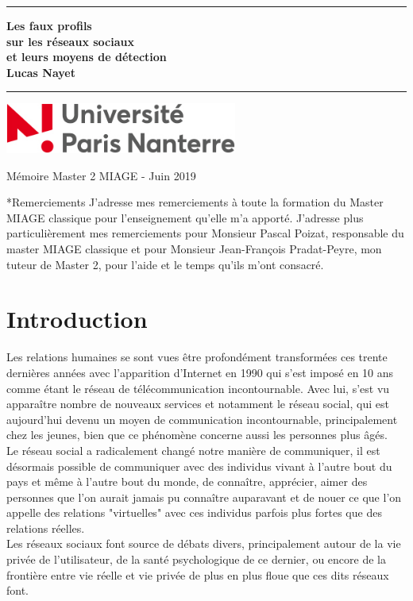\documentclass[12pt]{report}
\newcommand{\LMUTitle}[9]{
  \thispagestyle{empty}
  \vspace*{\stretch{1}}
  {\parindent0cm
   \rule{\linewidth}{.7ex}}
  \begin{flushright}

    \vspace*{\stretch{1}}
    \sffamily\bfseries\Huge
    #1\\
    \vspace*{\stretch{1}}
    \sffamily\bfseries\large
    #2
    \vspace*{\stretch{1}}
  \end{flushright}
  \rule{\linewidth}{.7ex}
  \vspace*{\stretch{5}}
  \begin{center}
    \includegraphics[width=3in]{UPN-logo.jpg}
  \end{center}
  \vspace*{\stretch{1}}
  \begin{center}\sffamily\LARGE{#3}\end{center}
  \newpage
  \thispagestyle{empty}
}
\begin{document}
  \LMUTitle
      {Les faux profils\\
      sur les réseaux sociaux\\
      et leurs moyens de détection}              
      {Lucas Nayet}                       
      {Mémoire Master 2 MIAGE - Juin 2019}                          
\thispagestyle{empty}

\setcounter{page}{}
\chapter*{Remerciements}
J'adresse mes remerciements à toute la formation du Master MIAGE classique pour l'enseignement qu'elle m'a apporté. J'adresse plus particulièrement mes remerciements pour Monsieur Pascal Poizat, responsable du master MIAGE classique et pour Monsieur Jean-François Pradat-Peyre, mon tuteur de Master 2, pour l'aide et le temps qu'ils m'ont consacré. 

\makeatletter
\def\@makechapterhead#1{%
  \vspace*{50\p@}%
  {\parindent \z@ \raggedright \normalfont
    \Huge \bfseries #1\par\nobreak
    \vskip 40\p@
  }}
\makeatother

\renewcommand{\contentsname}{Sommaire}
{\tableofcontents}

\chapter{Introduction}
Les relations humaines se sont vues être profondément transformées ces trente dernières années avec l'apparition d'Internet en 1990 qui s'est imposé en 10 ans comme étant le réseau de télécommunication incontournable. Avec lui, s'est vu apparaître nombre de nouveaux services et notamment le réseau social, qui est aujourd'hui devenu un moyen de communication incontournable, principalement chez les jeunes, bien que ce phénomène concerne aussi les personnes plus âgés.\\

Le réseau social a radicalement changé notre manière de communiquer, il est désormais possible de communiquer avec des individus vivant à l'autre bout du pays et même à l'autre bout du monde, de connaître, apprécier, aimer des personnes que l'on aurait jamais pu connaître auparavant et de nouer ce que l'on appelle des relations "virtuelles" avec ces individus parfois plus fortes que des relations réelles. \\


Les réseaux sociaux font source de débats divers, principalement autour de la vie privée de l'utilisateur, de la santé psychologique de ce dernier, ou encore de la frontière entre vie réelle et vie privée de plus en plus floue que ces dits réseaux font. \\
\end{document}
